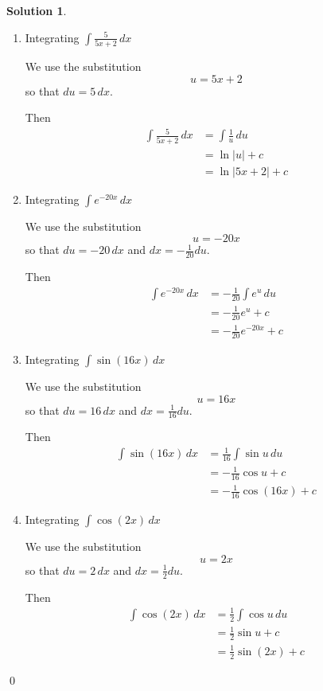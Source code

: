 \documentclass[a4paper]{article}
\theoremstyle{plain} %
\theoremstyle{definition} %
\newtheorem*{solution}{Solution}
\numberwithin{equation}{subsection}
\begin{document}
\begin{solution}

\begin{enumerate}
    \item Integrating $\displaystyle \int \frac{5}{5x+2}\,dx$

    We use the substitution
    \[
        u = 5x+2
    \]
    so that $du = 5\,dx$.

    Then
    \begin{align*}
        \int \frac{5}{5x+2}\,dx
        &= \int \frac{1}{u}\,du\\
        &= \ln|u| + c\\
        &= \ln|5x+2| + c
    \end{align*}

    \item Integrating $\int e^{-20x}\,dx$

    We use the substitution
    \[
        u = -20x
    \]
    so that $du = -20\,dx$ and $dx = -\frac{1}{20}du$.

    Then
    \begin{align*}
        \int e^{-20x}\,dx
        &= -\frac{1}{20}\int e^u\,du\\
        &= -\frac{1}{20}e^u + c\\
        &= -\frac{1}{20}e^{-20x} + c
    \end{align*}

    \item Integrating $\int \sin(16x)\,dx$

    We use the substitution
    \[
        u = 16x
    \]
    so that $du = 16\,dx$ and $dx = \frac{1}{16}du$.

    Then
    \begin{align*}
        \int \sin(16x)\,dx
        &= \frac{1}{16}\int \sin u\,du\\
        &= -\frac{1}{16}\cos u + c\\
        &= -\frac{1}{16}\cos(16x) + c
    \end{align*}

    \item Integrating $\int \cos(2x)\,dx$

    We use the substitution
    \[
        u = 2x
    \]
    so that $du = 2\,dx$ and $dx = \frac{1}{2}du$.

    Then
    \begin{align*}
        \int \cos(2x)\,dx
        &= \frac{1}{2}\int \cos u\,du\\
        &= \frac{1}{2}\sin u + c\\
        &= \frac{1}{2}\sin(2x) + c
    \end{align*}
\end{enumerate}
\qed
\end{solution}
\end{document}
